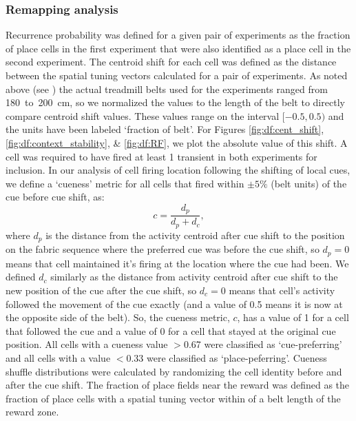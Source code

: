 \subsubsection{Remapping analysis}
Recurrence probability was defined for a given pair of experiments as the fraction of place cells in the first experiment that were also identified as a place cell in the second experiment. The centroid shift for each cell was defined as the distance between the spatial tuning vectors calculated for a pair of experiments. As noted above (see ) the actual treadmill belts used for the experiments ranged from 180~to~200~cm, so we normalized the values to the length of the belt to directly compare centroid shift values. These values range on the interval $[-0.5, 0.5)$ and the units have been labeled `fraction of belt'. For Figures \ref{fig:df:cent_shift}, \ref{fig:df:context_stability}, \& \ref{fig:df:RF}, we plot the absolute value of this shift. A cell was required to have fired at least 1 transient in both experiments for inclusion. In our analysis of cell firing location following the shifting of local cues, we define a `cueness' metric for all cells that fired within $\pm5\%$ (belt units) of the cue before cue shift, as:
$$c = \frac{d_p}{d_p+d_c},$$
where $d_p$ is the distance from the activity centroid after cue shift to the position on the fabric sequence where the preferred cue was before the cue shift, so $d_p = 0$ means that cell maintained it's firing at the location where the cue had been. We defined $d_c$ similarly as the distance from activity centroid after cue shift to the new position of the cue after the cue shift, so $d_c = 0$ means that cell's activity followed the movement of the cue exactly (and a value of 0.5 means it is now at the opposite side of the belt). So, the cueness metric, $c$, has a value of 1 for a cell that followed the cue and a value of 0 for a cell that stayed at the original cue position. All cells with a cueness value $>$0.67 were classified as `cue-preferring' and all cells with a value $<$0.33 were classified as `place-peferring'. Cueness shuffle distributions were calculated by randomizing the cell identity before and after the cue shift. The fraction of place fields near the reward was defined as the fraction of place cells with a spatial tuning vector within  of a belt length of the reward zone.
